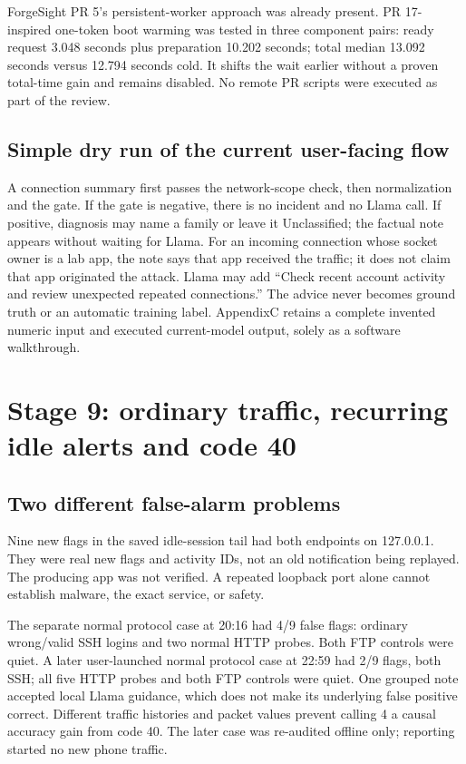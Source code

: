 \documentclass[11pt,a4paper,oneside]{report}
\begin{document}
ForgeSight PR 5's persistent-worker approach was already present. PR 17-inspired one-token boot warming was tested in three component pairs: ready request 3.048 seconds plus preparation 10.202 seconds; total median 13.092 seconds versus 12.794 seconds cold. It shifts the wait earlier without a proven total-time gain and remains disabled. No remote PR scripts were executed as part of the review.

\section{Simple dry run of the current user-facing flow}
A connection summary first passes the network-scope check, then normalization and the gate. If the gate is negative, there is no incident and no Llama call. If positive, diagnosis may name a family or leave it Unclassified; the factual note appears without waiting for Llama. For an incoming connection whose socket owner is a lab app, the note says that app received the traffic; it does not claim that app originated the attack. Llama may add ``Check recent account activity and review unexpected repeated connections.'' The advice never becomes ground truth or an automatic training label. AppendixC retains a complete invented numeric input and executed current-model output, solely as a software walkthrough.

\chapter{Stage 9: ordinary traffic, recurring idle alerts and code 40}
\section{Two different false-alarm problems}
Nine new flags in the saved idle-session tail had both endpoints on 127.0.0.1. They were real new flags and activity IDs, not an old notification being replayed. The producing app was not verified. A repeated loopback port alone cannot establish malware, the exact service, or safety.

The separate normal protocol case at 20:16 had 4/9 false flags: ordinary wrong/valid SSH logins and two normal HTTP probes. Both FTP controls were quiet. A later user-launched normal protocol case at 22:59 had 2/9 flags, both SSH; all five HTTP probes and both FTP controls were quiet. One grouped note accepted local Llama guidance, which does not make its underlying false positive correct. Different traffic histories and packet values prevent calling 4 a causal accuracy gain from code 40. The later case was re-audited offline only; reporting started no new phone traffic.
\end{document}
